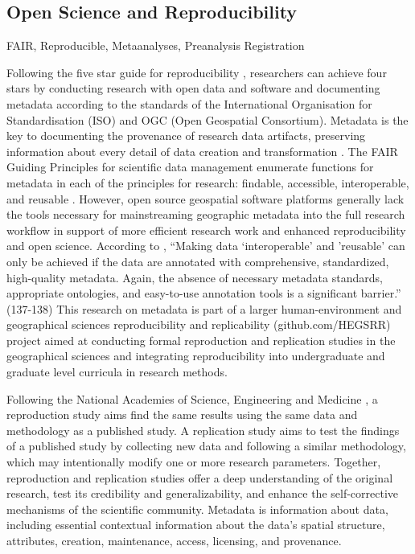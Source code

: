 \documentclass{isprs} %
\begin{document}
\subsection{Open Science and Reproducibility}\label{sec:Metadata}

FAIR, Reproducible, Metaanalyses, Preanalysis Registration

Following the five star guide for reproducibility \citep{Wilson2021}, researchers can achieve four stars by conducting research with open data and software and documenting metadata according to the standards of the International Organisation for Standardisation (ISO) and OGC (Open Geospatial Consortium).
Metadata is the key to documenting the provenance of research data artifacts, preserving information about every detail of data creation and transformation \citep{Tullis2021}. The FAIR Guiding Principles for scientific data management enumerate functions for metadata in each of the principles for research: findable, accessible, interoperable, and reusable \citep{Wilkinson2016}.
However, open source geospatial software platforms generally lack the tools necessary for mainstreaming geographic metadata into the full research workflow in support of more efficient research work and enhanced reproducibility and open science.
According to \citet[137-8]{NASEM2018}, ``Making data `interoperable' and 'reusable' can only be achieved if the data are annotated with comprehensive, standardized, high-quality metadata. Again, the absence of necessary metadata standards, appropriate ontologies, and easy-to-use annotation tools is a significant barrier.'' (137-138)
This research on metadata is part of a larger human-environment and geographical sciences reproducibility and replicability (github.com/HEGSRR) project aimed at conducting formal reproduction and replication studies in the geographical sciences and integrating reproducibility into undergraduate and graduate level curricula in research methods.

Following the National Academies of Science, Engineering and Medicine \citep{NASEM2019}, a reproduction study aims find the same results using the same data and methodology as a published study.
A replication study aims to test the findings of a published study by collecting new data and following a similar methodology, which may intentionally modify one or more research parameters.
Together, reproduction and replication studies offer a deep understanding of the original research, test its credibility and generalizability, and enhance the self-corrective mechanisms of the scientific community.
Metadata is information about data, including essential contextual information about the data's spatial structure, attributes, creation, maintenance, access, licensing, and provenance.
\end{document}
